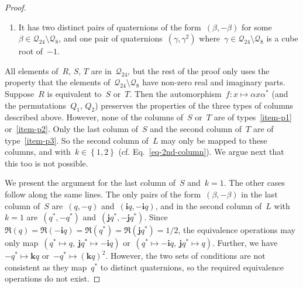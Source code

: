 \documentclass[10pt,a4paper]{amsart}
\newcommand{\Q}{\mathcal{Q}}
\newcommand{\qi}{\mathbf{i}}
\newcommand{\qj}{\mathbf{j}}
\newcommand{\qk}{\mathbf{k}}
\newcommand{\set}[1]{\left\{ #1 \right\}}
\begin{document}
\begin{proof}
\begin{enumerate}
\item \label{item-p3}
It has two distinct pairs of quaternions of the form~$(\beta, -\beta)$ for some~$\beta \in \Q_{24} \setminus \Q_8$, and one pair of quaternions~$(\gamma, \gamma^2)$ where~$\gamma \in \Q_{24} \setminus \Q_8$ is a cube root of~$-1$. 

\end{enumerate}

All elements of~$R$, $S$, $T$ are in~$\Q_{24}$, but the rest of the proof only uses the property that the elements of~$ \Q_{24} \setminus \Q_8$ have non-zero real and imaginary parts. Suppose~$R$ is equivalent to~$S$ or~$T$. Then the automorphism~$f \colon x \mapsto \alpha x \alpha^* $ (and the permutations~$Q_1$, $Q_2$) preserves the properties of the three types of columns described above. However, none of the columns of~$S$ or~$T$ are of types~\ref{item-p1} or~\ref{item-p2}. Only the last column of~$S$ and the second column of~$T$ are of type~\ref{item-p3}. So the second column of~$L$ may only be mapped to these columns, and with~$k \in \set{1,2}$ (cf. Eq.~\eqref{eq-2nd-column}). We argue next that this too is not possible.

We present the argument for the last column of~$S$ and~$k = 1$. The other cases follow along the same lines.
The only pairs of the form~$(\beta, -\beta)$ in the last column of~$S$ are~$(q,-q)$ and~$(\qi q, -\qi q)$, and in the second column of~$L$ with~$k = 1$ are~$(q^*, -q^*)$ and~$(\qj q^*, -\qj q^*)$. Since~$\Re(q) = \Re(-\qi q) = \Re(q^*) = \Re(\qj q^*) = 1/2$, the equivalence operations may only map~$(q^* \mapsto q, ~ \qj q^* \mapsto -\qi q)$ or~$(q^* \mapsto -\qi q, ~ \qj q^* \mapsto q)$. Further, we have~$-q^* \mapsto \qk q$ or~$-q^* \mapsto (\qk q)^2$. However, the two sets of conditions are not consistent as they map~$q^*$ to distinct quaternions, so the required equivalence operations do not exist.
\end{proof}
\end{document}
